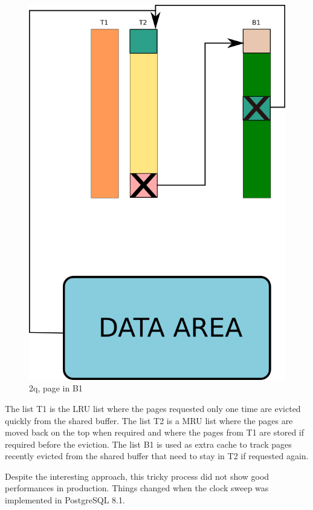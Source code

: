 \begin{figure}[H]
\includegraphics[scale=0.4]{images/2q_04.png}

\caption{2q, page in B1}

\end{figure}

The list T1 is the LRU list where the pages requested only one time are evicted quickly from the shared buffer. 
The list T2 is a MRU list where the pages are moved back on the top when required and where the pages from 
T1 are stored if required before the eviction. The list B1 is used as extra cache to track pages 
recently evicted from the shared buffer that need to stay in T2 if requested again.\newline

Despite the interesting approach, this tricky process did not show good performances in production. Things changed 
when the clock sweep was implemented in PostgreSQL 8.1.


